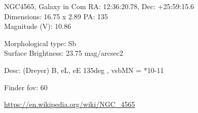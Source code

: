 \begin{block}{NGC4565, Galaxy in Com}
    RA: 12:36:20.78, Dec: +25:59:15.6 \\ 
    Dimensions: 16.75 x 2.89 PA: 135 \\ 
    Magnitude (V): 10.86

    Morphological type: Sb \\ 
    Surface Brightness: 23.75 mag/arcsec2 

    Desc: (Dreyer) B, eL, eE 135deg , vsbMN = *10-11 

    Finder fov: 60 

    \url{https://en.wikipedia.org/wiki/NGC_4565} 
\end{block}